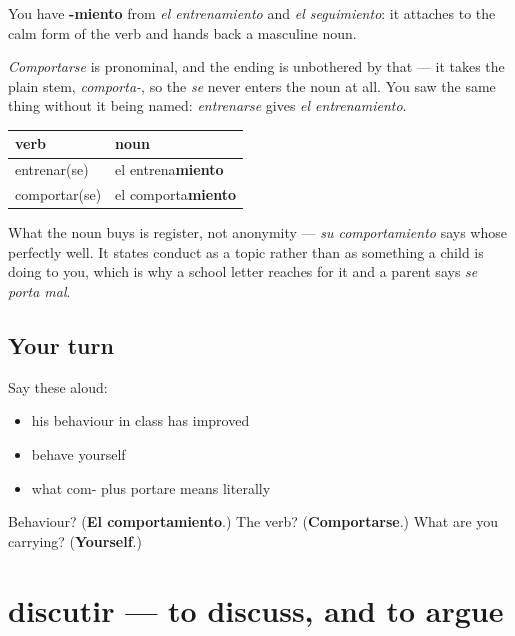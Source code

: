\begin{grammarlens}[title={Grammar Lens: -miento on a reflexive verb}]
You have \textbf{-miento} from \emph{el entrenamiento} and \emph{el seguimiento}: it attaches to the calm form of the verb and hands back a masculine noun.

\emph{Comportarse} is pronominal, and the ending is unbothered by that — it takes the plain stem, \emph{comporta-}, so the \emph{se} never enters the noun at all. You saw the same thing without it being named: \emph{entrenarse} gives \emph{el entrenamiento}.

\noindent
\begin{tabularx}{\linewidth}{@{}>{\raggedright\arraybackslash}X>{\raggedright\arraybackslash}X@{}}
\toprule
\textbf{verb} & \textbf{noun} \\
\midrule
entrenar(se) & el entrena\textbf{miento} \\
comportar(se) & el comporta\textbf{miento} \\
\bottomrule
\end{tabularx}

What the noun buys is register, not anonymity — \emph{su comportamiento} says whose perfectly well. It states conduct as a topic rather than as something a child is doing to you, which is why a school letter reaches for it and a parent says \emph{se porta mal}.
\end{grammarlens}

\subsection*{Your turn}
Say these aloud:

\begin{itemize}
\raggedright
  \item his behaviour in class has improved
  \item behave yourself
  \item what com- plus portare means literally
\end{itemize}

\begin{tcolorbox}[breakable,colback=teal!4,colframe=teal!35!black,title={Before you move on}]
Behaviour? (\textbf{El comportamiento}.) The verb? (\textbf{Comportarse}.) What are you carrying? (\textbf{Yourself}.)
\end{tcolorbox}
\section[discutir]{discutir — to discuss, and to argue}

